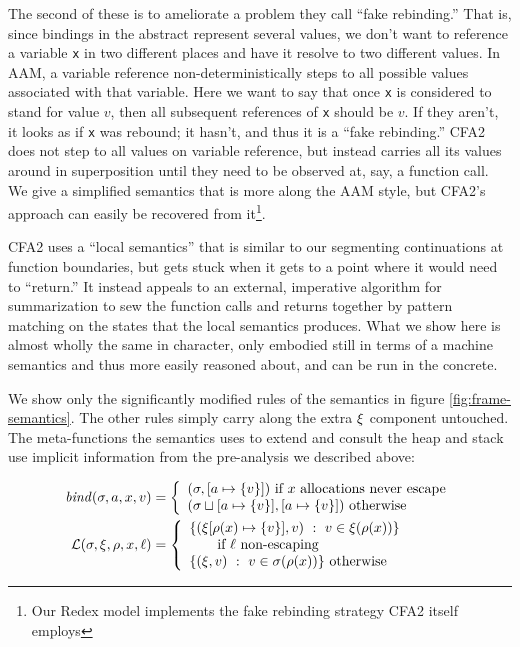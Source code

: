 The second of these is to ameliorate a problem they call ``fake rebinding.''
%
That is, since bindings in the abstract represent several values, we don't want to reference a variable \texttt{x} in two different places and have it resolve to two different values.
%
In AAM, a variable reference non-deterministically steps to all possible values associated with that variable.
%
Here we want to say that once \texttt{x} is considered to stand for value $v$, then all subsequent references of \texttt{x} should be $v$.
%
If they aren't, it looks as if \texttt{x} was rebound; it hasn't, and thus it is a ``fake rebinding.''
%
CFA2 does not step to all values on variable reference, but instead carries all its values around in superposition until they need to be observed at, say, a function call.
%
We give a simplified semantics that is more along the AAM style, but CFA2's approach can easily be recovered from it\footnote{Our Redex model implements the fake rebinding strategy CFA2 itself employs}.

CFA2 uses a ``local semantics'' that is similar to our segmenting continuations at function boundaries, but gets stuck when it gets to a point where it would need to ``return.''
%
It instead appeals to an external, imperative algorithm for summarization to sew the function calls and returns together by pattern matching on the states that the local semantics produces.
%
What we show here is almost wholly the same in character, only embodied still in terms of a machine semantics and thus more easily reasoned about, and can be run in the concrete.

We show only the significantly modified rules of the semantics in figure \ref{fig:frame-semantics}.
%
The other rules simply carry along the extra $\xi$ component untouched.
%
The meta-functions the semantics uses to extend and consult the heap and stack use implicit information from the pre-analysis we described above:

\begin{align*}
  \mathit{bind}(\sigma,a,x,v) &=
   \left\{\begin{array}{l}
            (\sigma, [a \mapsto \{ v \}]) \text{ if } x \text{ allocations never escape} \\
            (\sigma\sqcup[a \mapsto \{ v \}], [a \mapsto \{ v \}]) \text{ otherwise} \\
          \end{array}\right. \\
  {\mathcal L}(\sigma,\xi,\rho,x,\ell) &=
    \left\{\begin{array}{l}
          \{ (\xi[\rho(x) \mapsto \{ v \}], v)\ :\ v \in \xi(\rho(x))\}
                   \\ \qquad \text{if } \ell \text{ non-escaping} \\
          \{ (\xi,v)\ :\ v \in \sigma(\rho(x))\} \text{ otherwise}
           \end{array}\right.
\end{align*}

